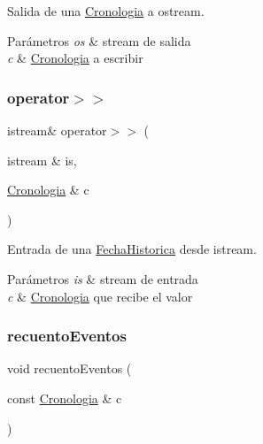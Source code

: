 Salida de una \hyperlink{classCronologia}{Cronologia} a ostream. 


\begin{DoxyParams}{Parámetros}
{\em os} & stream de salida \\
\hline
{\em c} & \hyperlink{classCronologia}{Cronologia} a escribir \\
\hline
\end{DoxyParams}
\mbox{\label{classCronologia_a6fa0f1131309b1cee355b9d8297ea33d}} 
\subsubsection{\texorpdfstring{operator$>$$>$}{operator>>}}
{\footnotesize\ttfamily istream\& operator$>$$>$ (\begin{DoxyParamCaption}\item[{istream \&}]{is,  }\item[{\hyperlink{classCronologia}{Cronologia} \&}]{c }\end{DoxyParamCaption})\hspace{0.3cm}{\ttfamily [friend]}}



Entrada de una \hyperlink{classFechaHistorica}{Fecha\+Historica} desde istream. 


\begin{DoxyParams}{Parámetros}
{\em is} & stream de entrada \\
\hline
{\em c} & \hyperlink{classCronologia}{Cronologia} que recibe el valor \\
\hline
\end{DoxyParams}
\mbox{\label{classCronologia_a8ada14624be65bded6fc9c445681d70e}} 
\subsubsection{\texorpdfstring{recuento\+Eventos}{recuentoEventos}}
{\footnotesize\ttfamily void recuento\+Eventos (\begin{DoxyParamCaption}\item[{const \hyperlink{classCronologia}{Cronologia} \&}]{c }\end{DoxyParamCaption})\hspace{0.3cm}{\ttfamily [friend]}}



